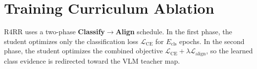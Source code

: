 \documentclass[10pt,twocolumn,letterpaper]{article}
\begin{document}
\begin{table}[h]
\centering
\caption{\textbf{Exact GALS vs.\ R4RR component-ablation results.} A: GALS+ours; B: R4RR+GALS RN50; C: R4RR+GALS ViT; D: full R4RR. Higher is better.}
\label{tab:supp_exact_gals_r4rr_ablation}
\small
\setlength{\tabcolsep}{5pt}
\renewcommand{\arraystretch}{1.12}
\end{table}


\FloatBarrier




\section{Training Curriculum Ablation}
\label{sec:ablationtrainingcuriculum}

R4RR uses a two-phase \textbf{Classify$\rightarrow$Align} schedule. In the first phase, the student optimizes only the classification loss $\mathcal{L}_{\mathrm{CE}}$ for $E_{\mathrm{cls}}$ epochs. In the second phase, the student optimizes the combined objective $\mathcal{L}_{\mathrm{CE}}+\lambda\mathcal{L}_{\mathrm{align}}$, so the learned class evidence is redirected toward the VLM teacher map.
\end{document}
